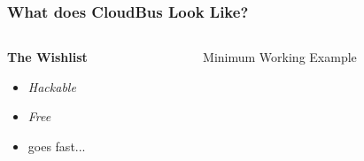 \begin{frame}
	\frametitle{What does CloudBus Look Like?}
	\begin{columns}
		\begin{column}{0.4\textwidth}
			\LARGE \textbf{The Wishlist} \normalsize\vspace{1em}
			\begin{itemize}
				\item \emph{Hackable}\vspace{1em}
				\item \emph{Free} \vspace{1em}\scriptsize
				\item goes fast...
			\end{itemize}
		\end{column}
		\begin{column}{0.5\textwidth}
			\begin{figure}
				
				\caption{Minimum Working Example}
			\end{figure}			
		\end{column}
	\end{columns}
\end{frame}
